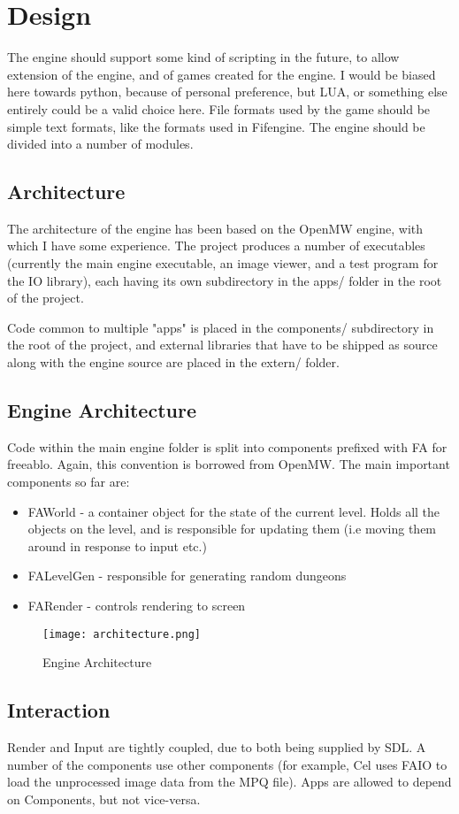   \chapter{Design}
    The engine should support some kind of scripting in the future, to allow extension of the engine, and of games created for the engine. I would be biased here towards python, because of personal preference, but LUA, or something else entirely could be a valid choice here.
    File formats used by the game should be simple text formats, like the formats used in Fifengine.
    The engine should be divided into a number of modules.
    
    \section{Architecture}
    The architecture of the engine has been based on the OpenMW\cite{openmw} engine, with which I have some experience.
    The project produces a number of executables (currently the main engine executable, an image viewer, and a test program for the IO library), each having its own subdirectory in the apps/ folder in the root of the project.
    
    Code common to multiple "apps" is placed in the components/ subdirectory in the root of the project, and external libraries that have to be shipped as source along with the engine source are placed in the extern/ folder.
    
    \section{Engine Architecture}
    Code within the main engine folder is split into components prefixed with FA for freeablo. Again, this convention is borrowed from OpenMW\cite{openmw}.
    The main important components so far are:
    \begin{itemize}
        \item{FAWorld - a container object for the state of the current level. Holds all the objects on the level, and is responsible for updating them (i.e moving them around in response to input etc.)}
        \item{FALevelGen - responsible for generating random dungeons}
        \item{FARender - controls rendering to screen}
    \end{itemize}

	\begin{figure}
		\centering	
		\texttt{[image: architecture.png]}
		\caption{Engine Architecture}
	\end{figure}
	
	\section{Interaction}
	Render and Input are tightly coupled, due to both being supplied by SDL.
	A number of the components use other components (for example, Cel uses FAIO to load the unprocessed image data from the MPQ file).
	Apps are allowed to depend on Components, but not vice-versa.